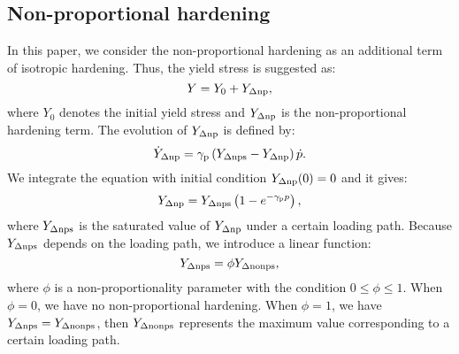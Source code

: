 \subsection{Non-proportional hardening}
\noindent
In this paper, we consider the non-proportional hardening as an additional term of isotropic hardening.
Thus, the yield stress is suggested as:
\begin{equation}
Y = {Y_0} + {Y_{\Delta \rm np}},
\end{equation}
where $Y_0$ denotes the initial yield stress and ${Y_{\Delta \rm np}}$ is the non-proportional hardening term.
The evolution of ${Y_{\Delta \rm np}}$ is defined by:
\begin{equation}
{\dot Y_{\Delta \rm np}} = {\gamma _{\rm p}}\left( {{Y_{\Delta \rm nps}} - {Y_{\Delta \rm np}}} \right)\dot p.
\end{equation}
We integrate the equation with initial condition ${Y_{\Delta \rm np}}(0)=0$ and it gives:
\begin{equation}
{Y_{\Delta \rm np}} = Y_{\Delta \rm nps}\left( 1-e^{- \gamma _{\rm p} p} \right),
\end{equation}
where $Y_{\Delta \rm nps}$ is the saturated value of ${Y_{\Delta \rm np}}$ under a certain loading path.
Because ${Y_{\Delta \rm nps}}$ depends on the loading path, we introduce a linear function:
\begin{equation}
{Y_{\Delta \rm nps}} = \phi {Y_{\Delta \rm nonps}},
\end{equation}
where $\phi$ is a non-proportionality parameter with the condition $0 \leq \phi \leq 1$.
When $\phi = 0$, we have no non-proportional hardening.
When $\phi = 1$, we have ${Y_{\Delta \rm nps}} = {Y_{\Delta \rm nonps}}$, then ${Y_{\Delta \rm nonps}}$ represents the maximum value corresponding to a certain loading path.

